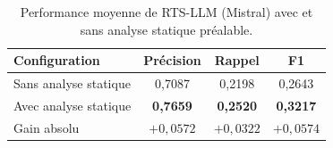 \documentclass[12pt,a4paper]{article}
\begin{document}
   \begin{table}[ht]
     \centering
   \caption{Performance moyenne de RTS-LLM (Mistral) avec et sans analyse statique préalable.}
     \label{tab:resultats-mistral}
   \begin{tabular}{lccc}
       \toprule
      \textbf{Configuration} & \textbf{Précision} & \textbf{Rappel} & \textbf{F1} \\
       \midrule
       Sans analyse statique & 0{,}7087 & 0{,}2198 & 0{,}2643 \\
       Avec analyse statique & \textbf{0{,}7659} & \textbf{0{,}2520} & \textbf{0{,}3217} \\
       \midrule
       Gain absolu           & $+0{,}0572$ & $+0{,}0322$ & $+0{,}0574$ \\
       \bottomrule
     \end{tabular}
  
     \vspace{0.5em}

 \end{table}
\end{document}
